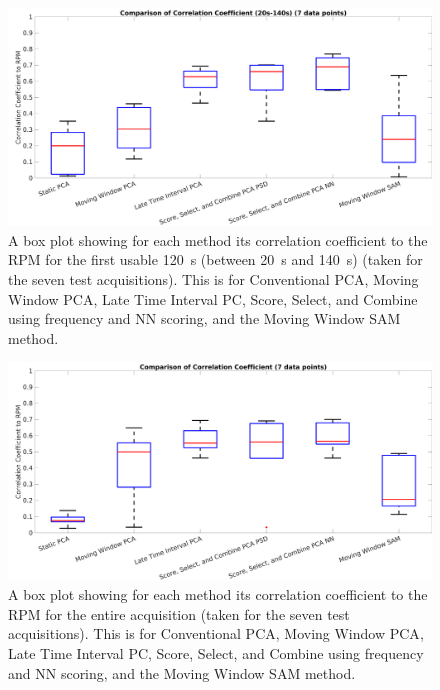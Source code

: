     \begin{figure}
        \centering
        
        \includegraphics[width=1.0\linewidth]{box_plot_early.png}
        
        \captionsetup{singlelinecheck=false}
        \caption{A box plot showing for each method its correlation coefficient to the \gls{RPM} for the first usable \SI{120}{\second} (between \SI{20}{\second} and \SI{140}{\second}) (taken for the seven test acquisitions). This is for Conventional \gls{PCA}, Moving Window \gls{PCA}, Late Time Interval \gls{PC}, Score, Select, and Combine using frequency and \gls{NN} scoring, and the Moving Window \gls{SAM} method.}
        \label{fig:box_plot_early}
    \end{figure}

    \begin{figure}
        \centering
        
        \includegraphics[width=1.0\linewidth]{box_plot_all.png}
        
        \captionsetup{singlelinecheck=false}
        \caption{A box plot showing for each method its correlation coefficient to the \gls{RPM} for the entire acquisition (taken for the seven test acquisitions). This is for Conventional \gls{PCA}, Moving Window \gls{PCA}, Late Time Interval \gls{PC}, Score, Select, and Combine using frequency and \gls{NN} scoring, and the Moving Window \gls{SAM} method.}
        \label{fig:box_plot_all}
    \end{figure}

